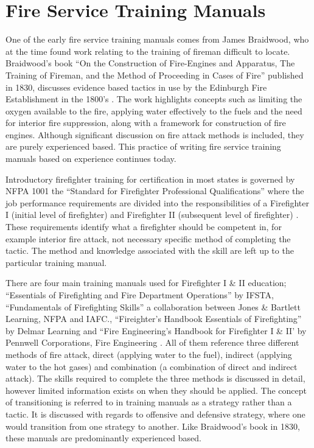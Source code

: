 \documentclass[12pt,oneside]{book}
\begin{document}

\section{Fire Service Training Manuals}
One of the early fire service training manuals comes from James Braidwood, who at the time found work relating to the training of fireman difficult to locate. Braidwood's book ``On the Construction of Fire-Engines and Apparatus, The Training of Fireman, and the Method of Proceeding in Cases of Fire'' published in 1830, discusses evidence based tactics in use by the Edinburgh Fire Establishment in the 1800's \cite{Braidwood:Training_Fireman}. The work highlights concepts such as limiting the oxygen available to the fire, applying water effectively to the fuels and the need for interior fire suppression, along with a framework for construction of fire engines. Although significant discussion on fire attack methods is included, they are purely experienced based. This practice of writing fire service training manuals based on experience continues today. 

Introductory firefighter training for certification in most states is governed by NFPA 1001 the ``Standard for Firefighter Professional Qualifications'' where the job performance requirements are divided into the responsibilities of a Firefighter I (initial level of firefighter) and Firefighter II (subsequent level of firefighter) \cite{NFPA1001}. These requirements identify what a firefighter should be competent in, for example interior fire attack, not necessary specific method of completing the tactic. The method and knowledge associated with the skill are left up to the particular training manual. 

There are four main training manuals used for Firefighter I \& II education;  ``Essentials of Firefighting and Fire Department Operations'' by IFSTA, ``Fundamentals of Firefighting Skills'' a collaboration between Jones \& Bartlett Learning, NFPA and IAFC., ``Fireighter's Handbook Essentials of Firefighting'' by Delmar Learning and ``Fire Engineering's Handbook for Firefighter I \& II' by Pennwell Corporations, Fire Engineering \cite{Stowell_Essentials6} \cite{JandB:Firefighter_Skills} \cite{Delmar:Firefighters_Handbook} \cite{Corbett_FE_FFI_FFII}. All of them reference three different methods of fire attack, direct (applying water to the fuel), indirect (applying water to the hot gases) and combination (a combination of direct and indirect attack). The skills required to complete the three methods is discussed in detail, however limited information exists on when they should be applied. The concept of transitioning is referred to in training manuals as a strategy rather than a tactic. It is discussed with regards to offensive and defensive strategy, where one would transition from one strategy to another.  Like Braidwood's book in 1830, these manuals are predominantly experienced based.
\end{document}
